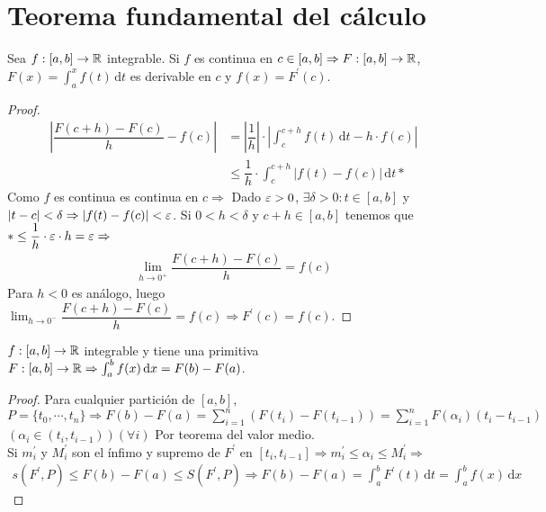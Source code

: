 \section{Teorema fundamental del cálculo}

\begin{theorem}
  Sea $f: [a, b] \to \mathbb{R}$ integrable. Si $f$ es continua en $c \in [a, b] \Rightarrow F: [a, b] \to \mathbb{R}$, $F(x) = \int_a^x f(t)\, \mathrm{d}t$ es derivable en $c$ y $f(x) = F^{\prime}(c)$.
  \begin{proof}
    \begin{align*}
      \left| \dfrac{F(c+h) - F(c)}{h} - f(c) \right| & = |\dfrac{1}{h}| \cdot \left| \int_c^{c+h} f(t)\, \mathrm{d}t - h \cdot f(c) \right| \\
      & \leq \dfrac{1}{h} \cdot \int_c^{c+h}| f(t) - f(c) | \, \mathrm{d}t *
    \end{align*}
    Como $f$ es continua es continua en $c \Rightarrow$ Dado $\varepsilon > 0$, $\exists \delta > 0 : t \in [a, b]$ y $|t-c| < \delta \Rightarrow |f(t) - f(c)| < \varepsilon$.
    Si $0 < h < \delta$ y $c+h \in [a, b]$ tenemos que $* \leq \dfrac{1}{h} \cdot \varepsilon \cdot h = \varepsilon \Rightarrow$ \begin{align*}
      \lim_{h \to 0^+} \dfrac{F(c+h) - F(c)}{h} = f(c)
    \end{align*}
    Para $h < 0$ es análogo, luego $\lim_{h \to 0^-} \dfrac{F(c+h) - F(c)}{h} = f(c) \Rightarrow F^{\prime}(c) = f(c)$.
  \end{proof}
\end{theorem}

\begin{corollary}
  $f: [a, b] \to \mathbb{R}$ integrable y tiene una primitiva $F: [a, b] \to \mathbb{R} \Rightarrow \int_a^b f(x) \, \mathrm{d}x = F(b) - F(a)$.
  \begin{proof}
    Para cualquier partición de $[a, b]$, $P = \{ t_0, \cdots, t_n \} \Rightarrow F(b) - F(a) = \sum_{i = 1}^n (F(t_i) - F(t_{i-1})) = \sum_{i = 1}^n F(\alpha_i) (t_i - t_{i-1})$ $(\alpha_i \in (t_i, t_{i-1}))(\forall i)$ Por teorema del valor medio. \\
    Si $m_i^{\prime}$ y $M_i^{\prime}$ son el ínfimo y supremo de $F^{\prime}$ en $[t_i, t_{i-1}] \Rightarrow m_i^{\prime} \leq \alpha_i \leq M_i^{\prime} \Rightarrow$\
    \begin{align*}
      s(F^{\prime}, P) \leq F(b) - F(a) \leq S(F^{\prime}, P) \Rightarrow F(b) - F(a) = \int_a^b F^{\prime}(t) \, \mathrm{d}t = \int_a^b f(x) \, \mathrm{d}x
    \end{align*}
  \end{proof}
\end{corollary}

